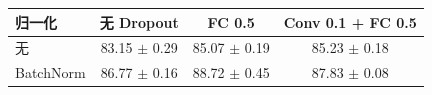 \begin{tabular}{lccc}
\toprule
归一化 & 无 Dropout & FC 0.5 & Conv 0.1 + FC 0.5 \\
\midrule
无 & 83.15 $\pm$ 0.29 & 85.07 $\pm$ 0.19 & 85.23 $\pm$ 0.18 \\
BatchNorm & 86.77 $\pm$ 0.16 & 88.72 $\pm$ 0.45 & 87.83 $\pm$ 0.08 \\
\bottomrule
\end{tabular}
